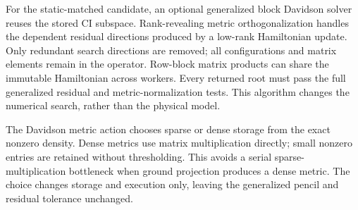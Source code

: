 For the static-matched candidate, an optional generalized block Davidson
solver reuses the stored CI subspace. Rank-revealing metric orthogonalization
handles the dependent residual directions produced by a low-rank Hamiltonian
update. Only redundant search directions are removed; all configurations
and matrix elements remain in the operator. Row-block matrix products can
share the immutable Hamiltonian across workers. Every returned root must
pass the full generalized residual and metric-normalization tests. This
algorithm changes the numerical search, rather than the physical model.

The Davidson metric action chooses sparse or dense storage from the exact
nonzero density. Dense metrics use matrix multiplication directly;
small nonzero entries are retained without thresholding. This avoids a
serial sparse-multiplication bottleneck when ground projection produces
a dense metric. The choice changes storage and execution only, leaving
the generalized pencil and residual tolerance unchanged.
